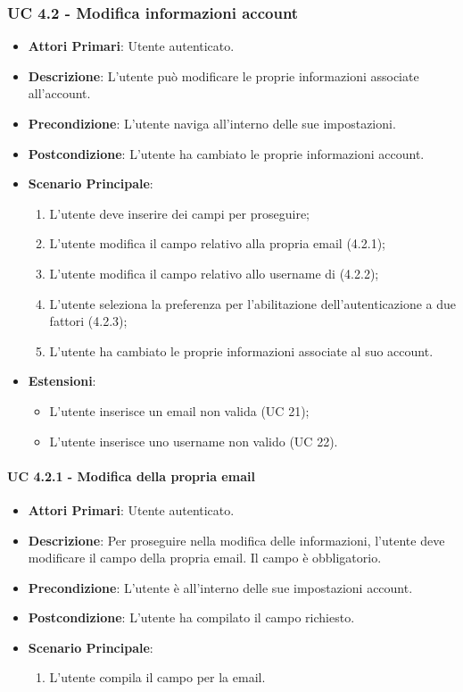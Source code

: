 			\subsubsection{UC 4.2 - Modifica informazioni account}
			\begin{itemize}
				\item \textbf{Attori Primari}: Utente autenticato.
				\item \textbf{Descrizione}: L'utente può modificare le proprie informazioni associate all'account.
				\item \textbf{Precondizione}: L'utente naviga all'interno delle sue impostazioni.
				\item \textbf{Postcondizione}: L'utente ha cambiato le proprie informazioni account.
				\item \textbf{Scenario Principale}:
				\begin{enumerate}
					\item L'utente deve inserire dei campi per proseguire;
					\item L'utente modifica il campo relativo alla propria email (4.2.1);
					\item L'utente modifica il campo relativo allo username di  (4.2.2);
					\item L'utente seleziona la preferenza per l'abilitazione dell'autenticazione a due fattori (4.2.3);
					\item L'utente ha cambiato le proprie informazioni associate al suo account.
				\end{enumerate}	
				\item \textbf{Estensioni}:
					\begin{itemize}
						\item L'utente inserisce un email non valida (UC 21);
						\item L'utente inserisce uno username  non valido (UC 22).
					\end{itemize}
			\end{itemize}

				\paragraph{UC 4.2.1 - Modifica della propria email}
				\begin{itemize}
					\item \textbf{Attori Primari}: Utente autenticato.
					\item \textbf{Descrizione}: Per proseguire nella modifica delle informazioni, l'utente deve modificare il campo della propria email. Il campo è obbligatorio.
					\item \textbf{Precondizione}: L'utente è all'interno delle sue impostazioni account.
					\item \textbf{Postcondizione}: L'utente ha compilato il campo richiesto.
					\item \textbf{Scenario Principale}:
					\begin{enumerate}
						\item L'utente compila il campo per la email.
					\end{enumerate}
				\end{itemize}

